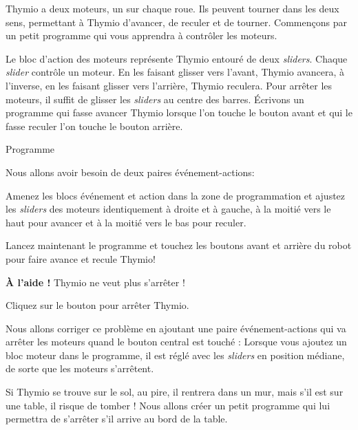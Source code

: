 \label{c.moving}


Thymio a deux moteurs, un sur chaque roue.
Ils peuvent tourner dans les deux sens, permettant à Thymio d'avancer, de reculer et de tourner. Commençons par un petit programme qui vous apprendra à contrôler les moteurs.

Le bloc d'action des moteurs  représente Thymio entouré de deux \textit{sliders}.
Chaque \textit{slider} contrôle un moteur.
En les faisant glisser vers l'avant, Thymio avancera, à l'inverse, en les faisant glisser vers l'arrière, Thymio reculera.
Pour arrêter les moteurs, il suffit de glisser les \textit{sliders} au centre des barres.
Écrivons un programme qui fasse avancer Thymio lorsque l'on touche le bouton avant et qui le fasse reculer l'on touche le bouton arrière.

{\raggedleft \hfill Programme }

Nous allons avoir besoin de deux paires événement-actions:

\begin{center}
\end{center}
Amenez les blocs événement et action dans la zone de programmation et ajustez les \textit{sliders} des moteurs identiquement à droite et à gauche, à la moitié vers le haut pour avancer et à la moitié vers le bas pour reculer.

Lancez maintenant le programme et touchez les boutons avant et arrière du robot pour faire avance et recule Thymio!


\textbf{À l'aide !} Thymio ne veut plus s'arrêter !

Cliquez sur le bouton  pour arrêter Thymio.

\newpage

Nous allons corriger ce problème en ajoutant une paire événement-actions qui va arrêter les moteurs quand le bouton central est touché : 
Lorsque vous ajoutez un bloc moteur dans le programme, il est réglé avec les \textit{sliders} en position médiane, de sorte que les moteurs s'arrêtent.


Si Thymio se trouve sur le sol, au pire, il rentrera dans un mur, mais s'il est sur une table, il risque de tomber !
Nous allons créer un petit programme qui lui permettra de s'arrêter s'il arrive au bord de la table.

